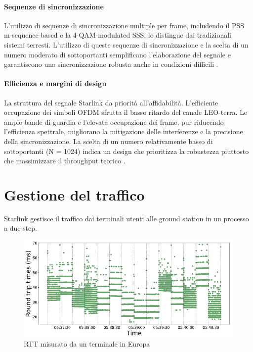 \paragraph{Sequenze di sincronizzazione}
L'utilizzo di sequenze di sincronizzazione multiple per frame, includendo il PSS m-sequence-based e la 4-\ac{QAM}-modulated SSS, lo distingue dai tradizionali sistemi terresti.
L'utilizzo di queste sequenze di sincronizzazione e la scelta di un numero moderato di sottoportanti semplificano l'elaborazione del segnale e garantiscono una sincronizzazione robusta anche in condizioni difficili \cite{humphreys_signal_2023}.

\paragraph{Efficienza e margini di design}
La struttura del segnale Starlink da priorità all'affidabilità.
L'efficiente occupazione dei simboli OFDM sfrutta il basso ritardo del canale \ac{LEO}-terra.
Le ampie bande di guardia e l'elevata occupazione dei frame, pur riducendo l'efficienza spettrale, migliorano la mitigazione delle interferenze e la precisione della sincronizzazione.
La scelta di un numero relativamente basso di sottoportanti (N = 1024) indica un design che prioritizza la robustezza piuttosto che massimizzare il throughput teorico \cite{humphreys_signal_2023}.

\section{Gestione del traffico}
Starlink gestisce il traffico dai terminali utenti alle ground station in un processo a due step.

\begin{figure}[htbp]
  \centering
  \includegraphics[width=0.8\linewidth]{./res/img/rtt_euterminal.png}
  \caption{\ac{RTT} misurato da un terminale in Europa \cite{tanveer_making_2023}}
  \label{fig:rtt-euterminal}
\end{figure}

